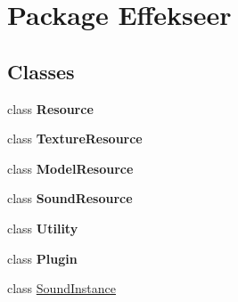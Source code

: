 \hypertarget{namespace_effekseer}{\section{Package Effekseer}
\label{namespace_effekseer}
}
\subsection*{Classes}
\begin{DoxyCompactItemize}
\item 
class {\bfseries Resource}
\item 
class {\bfseries Texture\-Resource}
\item 
class {\bfseries Model\-Resource}
\item 
class {\bfseries Sound\-Resource}
\item 
class {\bfseries Utility}
\item 
class {\bfseries Plugin}
\item 
class \hyperlink{class_effekseer_1_1_sound_instance}{Sound\-Instance}
\end{DoxyCompactItemize}
